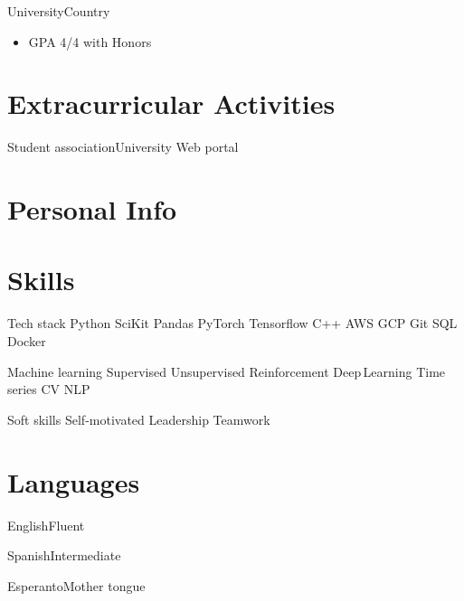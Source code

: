 \documentclass[letterpaper, 10pt, yearbullet]{techcv}
\begin{document}
\begin{paracol}{2}
\begin{joblist}
    {University}{Country}
    {\begin{itemize}
            \item GPA 4/4 with Honors
        \end{itemize}}
\end{joblist}


\section{Extracurricular Activities}

\begin{joblist}
	{Student association}{University}
    {\lipsum[66]}
    {Web portal}{}
    {\lipsum[66]}
\end{joblist}


\switchcolumn


\vspace{-0.5\baselineskip}
\section{Personal Info}
\makecontact


\section{Skills}

\begin{skills}
\item{Tech stack}
    {Python SciKit Pandas PyTorch Tensorflow
	C++ AWS GCP Git SQL Docker }
\item{Machine learning}
	{Supervised Unsupervised Reinforcement Deep\,Learning 
    Time\,series CV NLP}
\item{Soft skills}
	{  
	Self-motivated
    Leadership
    Teamwork
}
\end{skills}


\section{Languages}

\begin{languages}
    \item{English}{Fluent}	
    \item{Spanish}{Intermediate}
    \item{Esperanto}{Mother tongue}
\end{languages}



\end{paracol}
\end{document}
